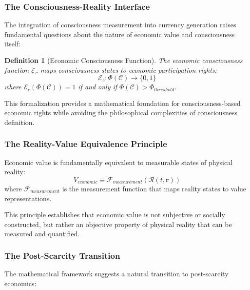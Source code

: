 \documentclass[12pt,a4paper]{article}
\newtheorem{definition}[theorem]{Definition}
\begin{document}
\subsubsection{The Consciousness-Reality Interface}

The integration of consciousness measurement into currency generation raises fundamental questions about the nature of economic value and consciousness itself:

\begin{definition}[Economic Consciousness Function]
The economic consciousness function $\mathcal{E}_c$ maps consciousness states to economic participation rights:
\begin{equation}
\mathcal{E}_c: \Phi(\mathcal{C}) \rightarrow \{0, 1\}
\end{equation}
where $\mathcal{E}_c(\Phi(\mathcal{C})) = 1$ if and only if $\Phi(\mathcal{C}) > \Phi_{threshold}$.
\end{definition}

This formalization provides a mathematical foundation for consciousness-based economic rights while avoiding the philosophical complexities of consciousness definition.

\subsubsection{The Reality-Value Equivalence Principle}

\begin{principle}
Economic value is fundamentally equivalent to measurable states of physical reality:
\begin{equation}
V_{economic} \equiv \mathcal{F}_{measurement}(\mathcal{R}(t,\mathbf{r}))
\end{equation}
where $\mathcal{F}_{measurement}$ is the measurement function that maps reality states to value representations.
\end{principle}

This principle establishes that economic value is not subjective or socially constructed, but rather an objective property of physical reality that can be measured and quantified.

\subsubsection{The Post-Scarcity Transition}

The mathematical framework suggests a natural transition to post-scarcity economics:
\end{document}

